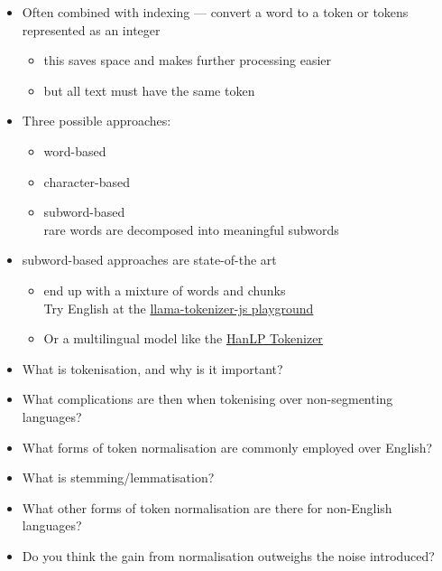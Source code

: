 \documentclass[a4paper,landscape,headrule,footrule,xetex]{foils}
\begin{document}
\begin{itemize}
\item Often combined with indexing --- convert a word to a token or tokens represented as an integer
  \begin{itemize}
  \item  this saves space and makes further processing easier
  \item but all text must have the same token
  \end{itemize}
\item Three possible approaches:
  \begin{itemize}
  \item word-based 
  \item character-based
  \item subword-based
    \\  rare words are decomposed into meaningful subwords
  \end{itemize}
\item subword-based approaches are state-of-the art
  \begin{itemize}
  \item end up with a mixture of words and chunks
   \\ Try English at the  \href{https://belladoreai.github.io/llama-tokenizer-js/example-demo/build/}{llama-tokenizer-js playground}
\item Or a multilingual model like the  \href{https://hanlp.hankcs.com/en/demos/tok.html}{HanLP Tokenizer}
  \end{itemize}  
\end{itemize}






\begin{itemize}
\item What is tokenisation, and why is it important?
\item What complications are then when tokenising over non-segmenting languages?
\item What forms of token normalisation are commonly employed over English?
\item What is stemming/lemmatisation?
\item What other forms of token normalisation are there for non-English languages?
\item Do you think the gain from normalisation outweighs the noise introduced?
\end{itemize}
\end{document}
